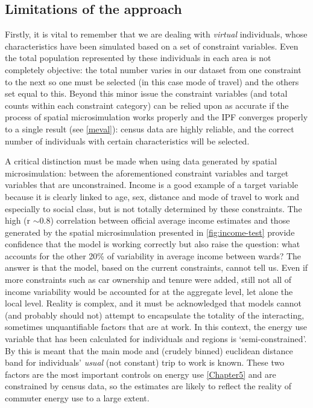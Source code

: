 \subsection{Limitations of the approach} \label{s:uncertainties}
Firstly, it is vital to remember that we are dealing with \emph{virtual}
individuals, whose characteristics have been simulated based on a set of
constraint variables. Even the total population represented by these individuals
in each area is not completely objective: the total number varies in our
dataset from one constraint to the next so one must be selected (in this
case mode of travel) and the others set equal to this. Beyond this minor issue
the constraint variables (and total counts within each constraint category)
can be relied upon as accurate if the process of spatial microsimulation
works properly and the IPF converges properly to a single result (see
\cref{meval}): census data are highly reliable, and the correct number
of individuals with certain characteristics will be selected.

A critical distinction must be made when using data generated by
spatial microsimulation: between the aforementioned constraint variables and
target variables that are unconstrained. Income is a good example of a target
variable because it is clearly linked to age, sex, distance and mode of travel to work and
especially to social class, but is not totally determined by these constraints.
The high (r $\sim$0.8) correlation between official average income estimates and those generated
by the spatial microsimulation presented in \cref{fig:income-test} provide confidence
that the model is working correctly but also raise the question: what accounts for the
other 20\% of variability in average income between wards?
The answer is that the model, based on the current constraints, cannot tell us.
Even if more constraints such as car ownership and tenure were added, still not all of
income variability would be accounted for at the aggregate level, let alone the local
level. Reality is complex, and it must be acknowledged that models cannot (and probably
should not) attempt to encapsulate the totality of the interacting, sometimes unquantifiable
factors that are at work. In this context, the energy use variable that has been
calculated for individuals and regions is `semi-constrained'. By this is meant
that the main mode and (crudely binned) euclidean distance band for
individuals' \emph{usual} (not constant) trip to work is known. These two
factors are the
most important controls on energy use \cref{Chapter5} and are constrained by
census data, so the estimates are likely to reflect the reality of commuter
energy use to a large extent. 

